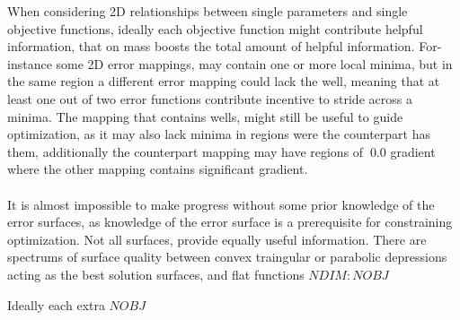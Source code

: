    
   When considering 2D relationships between single parameters and single objective functions, ideally each objective function might contribute helpful information, that on mass boosts the total amount of helpful information. For-instance some 2D error mappings, may contain one or more local minima, but in the same region a different error mapping could lack the well, meaning that at least one out of two error functions contribute incentive to stride across a minima. The mapping that contains wells, might still be useful to guide optimization, as it may also lack minima in regions were the counterpart has them, additionally the counterpart mapping may have regions of $~0.0$ gradient where the other mapping contains significant gradient.\\
   \\
   It is almost impossible to make progress without some prior knowledge of the error surfaces, as knowledge of the error surface is a prerequisite for constraining optimization. Not all surfaces, provide equally useful information. There are spectrums of surface quality between convex traingular or parabolic depressions acting as the best solution surfaces, and flat functions 
   $NDIM:NOBJ$
   
   Ideally each extra $NOBJ$  

